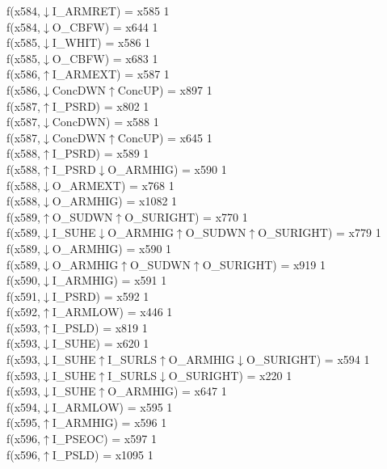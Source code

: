 f(x584,$\downarrow$I\_ARMRET) = x585 {1} \\
f(x584,$\downarrow$O\_CBFW) = x644 {1} \\
f(x585,$\downarrow$I\_WHIT) = x586 {1} \\
f(x585,$\downarrow$O\_CBFW) = x683 {1} \\
f(x586,$\uparrow$I\_ARMEXT) = x587 {1} \\
f(x586,$\downarrow$ConcDWN$\uparrow$ConcUP) = x897 {1} \\
f(x587,$\uparrow$I\_PSRD) = x802 {1} \\
f(x587,$\downarrow$ConcDWN) = x588 {1} \\
f(x587,$\downarrow$ConcDWN$\uparrow$ConcUP) = x645 {1} \\
f(x588,$\uparrow$I\_PSRD) = x589 {1} \\
f(x588,$\uparrow$I\_PSRD$\downarrow$O\_ARMHIG) = x590 {1} \\
f(x588,$\downarrow$O\_ARMEXT) = x768 {1} \\
f(x588,$\downarrow$O\_ARMHIG) = x1082 {1} \\
f(x589,$\uparrow$O\_SUDWN$\uparrow$O\_SURIGHT) = x770 {1} \\
f(x589,$\downarrow$I\_SUHE$\downarrow$O\_ARMHIG$\uparrow$O\_SUDWN$\uparrow$O\_SURIGHT) = x779 {1} \\
f(x589,$\downarrow$O\_ARMHIG) = x590 {1} \\
f(x589,$\downarrow$O\_ARMHIG$\uparrow$O\_SUDWN$\uparrow$O\_SURIGHT) = x919 {1} \\
f(x590,$\downarrow$I\_ARMHIG) = x591 {1} \\
f(x591,$\downarrow$I\_PSRD) = x592 {1} \\
f(x592,$\uparrow$I\_ARMLOW) = x446 {1} \\
f(x593,$\uparrow$I\_PSLD) = x819 {1} \\
f(x593,$\downarrow$I\_SUHE) = x620 {1} \\
f(x593,$\downarrow$I\_SUHE$\uparrow$I\_SURLS$\uparrow$O\_ARMHIG$\downarrow$O\_SURIGHT) = x594 {1} \\
f(x593,$\downarrow$I\_SUHE$\uparrow$I\_SURLS$\downarrow$O\_SURIGHT) = x220 {1} \\
f(x593,$\downarrow$I\_SUHE$\uparrow$O\_ARMHIG) = x647 {1} \\
f(x594,$\downarrow$I\_ARMLOW) = x595 {1} \\
f(x595,$\uparrow$I\_ARMHIG) = x596 {1} \\
f(x596,$\uparrow$I\_PSEOC) = x597 {1} \\
f(x596,$\uparrow$I\_PSLD) = x1095 {1} \\
